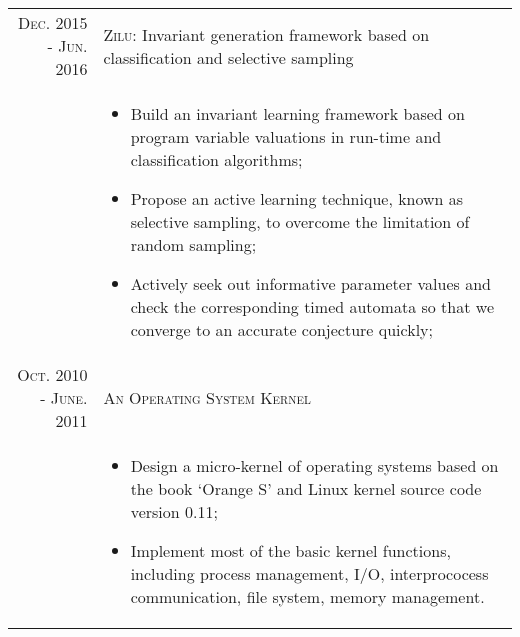 \documentclass[a4paper,10pt]{article}
\begin{document}
\begin{tabular}{rp{11cm}}
\textsc{Dec.} 2015 - \textsc{Jun.} 2016 & \textsc{Zilu:}   \footnotesize{Invariant generation framework based on classification and selective sampling}\\
&\footnotesize{
\begin{itemize}
	\item Build an invariant learning framework based on program variable valuations in run-time and classification algorithms;
	\item Propose an active learning technique, known as selective sampling, to overcome the limitation of random sampling;
	\item Actively seek out informative parameter values and check the corresponding timed automata so that we converge to an accurate conjecture quickly;
\end{itemize}
}\\


\textsc{Oct.} 2010 - \textsc{June.} 2011 & \textsc{An Operating System Kernel} \\
&\footnotesize{
\begin{itemize}
	\item Design a micro-kernel of operating systems based on the book `Orange S' and Linux kernel source code version 0.11;
	\item Implement most of the basic kernel functions, including process management, I/O, interprococess communication, file system, memory management.
\end{itemize}
} \\
\end{tabular}
\end{document}
